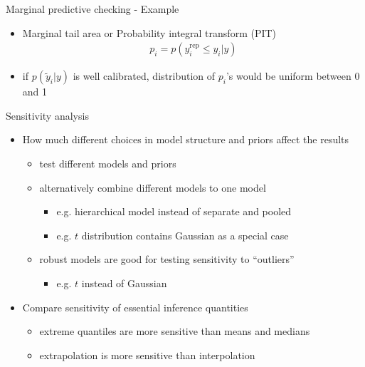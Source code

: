 \documentclass[t]{beamer}
\DeclareMathOperator{\rep}{\mathrm{rep}}
\begin{document}
\begin{frame}{Marginal predictive checking - Example}

  \begin{itemize}
  \item Marginal tail area or Probability integral transform (PIT)
    \begin{align*}
      p_i = p(y_i^{\rep} \leq y_i | y)
    \end{align*}
  \item if $p(\tilde{y}_i|y)$ is well calibrated, distribution of $p_i$'s
    would be uniform between 0 and 1
  \end{itemize}
  \vspace{-1.5\baselineskip}

\end{frame}

\begin{frame}{Sensitivity analysis}

  \begin{itemize}
  \item How much different choices in model structure and priors affect the results
    \begin{itemize}
      \item<2-> test different models and priors
      \item<3-> alternatively combine different models to one model
        \begin{itemize}
        \item e.g. hierarchical model instead of separate and pooled
        \item e.g. $t$ distribution contains Gaussian as a special case
      \end{itemize}
      \item<3-> robust models are good for testing sensitivity to ``outliers''
        \begin{itemize}
        \item e.g. $t$ instead of Gaussian
        \end{itemize}
    \end{itemize}
    \item<4-> Compare sensitivity of essential inference quantities
      \begin{itemize}
      \item extreme quantiles are more sensitive than means and medians
      \item extrapolation is more sensitive than interpolation
      \end{itemize}
    \end{itemize}

\end{frame}
\end{document}
